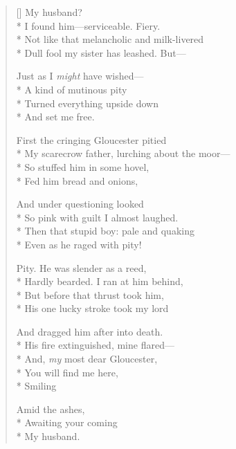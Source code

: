 \label{ch:lear_ao}
\settowidth{\versewidth}{My scarecrow father, lurching about the moor---}
\begin{verse}[\versewidth]
 My husband?\\*
I found him---serviceable. Fiery.\\*
Not like that melancholic and milk-livered\\*
Dull fool my sister has leashed. But---

Just as I \textit{might} have wished---\\*
A kind of mutinous pity\\*
Turned everything upside down\\*
And set me free.

First the cringing Gloucester pitied\\*
My scarecrow father, lurching about the moor---\\*
So stuffed him in some hovel,\\*
Fed him bread and onions,

And under questioning looked\\*
So pink with guilt I almost laughed.\\*
Then that stupid boy: pale and quaking\\*
Even as he raged with pity!

Pity.  He was slender as a reed,\\*
Hardly bearded. I ran at him behind,\\*
But before that thrust took him,\\*
His one lucky stroke took my lord

And dragged him after into death.\\*
His fire extinguished, mine flared---\\*
And, \textit{my} most dear Gloucester,\\*
You will find me here,\\*
\hspace*{3\vgap} Smiling

Amid the ashes,\\*
\hspace*{2\vgap} Awaiting your coming\\*
My husband.
\end{verse}
